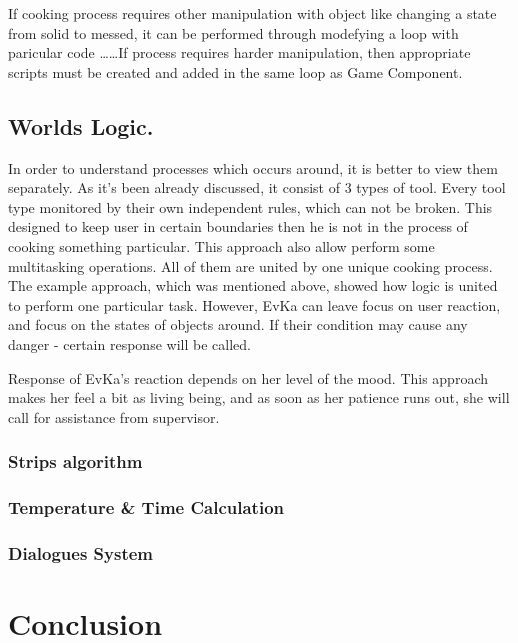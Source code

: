 \documentclass[18pt]{article}
\numberwithin{equation}{section} %
\numberwithin{figure}{section} %
\numberwithin{table}{section} %
\begin{document}
	If cooking process requires other manipulation with object like changing a state from solid to messed, it can be performed through modefying a loop with paricular code \ldots \ldots If process requires harder manipulation, then appropriate scripts must be created and added in the same loop as Game Component. 
	
	\subsection{Worlds Logic.}
	In order to understand processes which occurs around, it is better to view them separately. As it's been already discussed, it consist of 3 types of tool. Every tool type monitored by their own independent rules, which can not be broken. This designed to keep user in certain boundaries then he is not in the process of cooking something particular. This approach also allow perform some multitasking operations. All of them are united by one unique cooking process. The example approach, which was mentioned above, showed how logic is united to perform one particular task. However, EvKa can leave focus on user reaction, and focus on the states of objects around. If their condition may cause any danger - certain response will be called.
	
	Response of EvKa's reaction depends on her level of the mood. This approach makes her feel a bit as living being, and as soon as her patience runs out, she will call for assistance from supervisor.
	\subsubsection{Strips algorithm}
	\subsubsection{Temperature \& Time Calculation}
	\subsubsection{Dialogues System}
	
\section{Conclusion}
\end{document}
